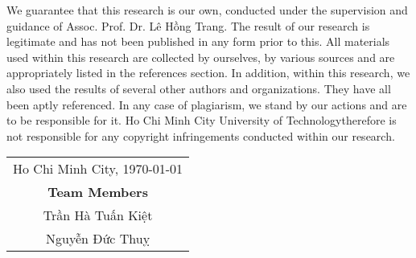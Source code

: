
\begin{declaration}

    We guarantee that this research is our own, conducted under the supervision and guidance of Assoc. Prof. Dr. Lê Hồng Trang. The result of our research is legitimate and has not been published in any form prior to this. All materials used within this research are collected by ourselves, by various sources and are appropriately listed in the references section. In addition, within this research, we also used the results of several other authors and organizations. They have all been aptly referenced. In any case of plagiarism, we stand by our actions and are to be responsible for it. Ho Chi Minh City University of 
 Technologytherefore is not responsible for any copyright infringements conducted within our research.

    \begin{flushright}

        \begin{tabular}{@{}c@{}} Ho Chi Minh City, \today \\
            \textbf{Team Members}    \\
            Trần Hà Tuấn Kiệt        \\
            Nguyễn Đức Thuỵ
        \end{tabular}

    \end{flushright}
\end{declaration}

\newpage

